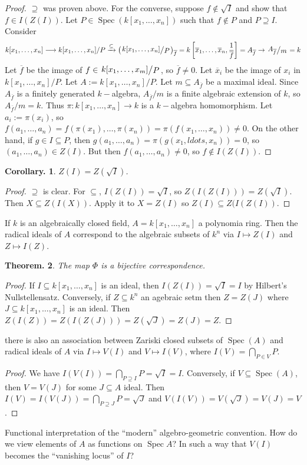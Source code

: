 \documentclass[11pt, a4paper]{memoir}
\newcommand{\lto}[0]{\ensuremath{\longrightarrow}}
\newcommand{\fto}[1]{\ensuremath{\xrightarrow{\scriptstyle{#1}}}}
\theoremstyle{change}
\newtheorem{theorem}{Theorem.}[section]
\newtheorem{corollary}[theorem]{Corollary.}
\theoremstyle{plain}
\theoremstyle{nonumberplain}
\newtheorem{proof}{Proof}
\DeclareMathOperator{\Spec}{Spec}
\newcommand{\quot}[2]{\mathchoice{\left.\raisebox{0.12em}{$#1$}\middle/\raisebox{-0.12em}{$#2$}\right.}
                                 {\left.\raisebox{0.06em}{$#1$}\middle/\raisebox{-0.06em}{$#2$}\right.}
                                 {\left.\raisebox{0.02em}{$#1$}\middle/\raisebox{-0.02em}{$#2$}\right.}
                                 {\left.\raisebox{0em}{$#1$}\middle/\raisebox{0em}{$#2$}\right.}}
\numberwithin{equation}{section}
\begin{document}
\begin{proof}
    $\supseteq$ was proven above.
    For the converse, suppose $f\notin\sqrt{I}$ and show that $f\in I(Z(I))$.
    Let $P\in\Spec(k[x_1,\ldots,x_n])$ such that $f\notin P$ and $P\supseteq I$.
    Consider
    \begin{equation*}
        k[x_1,\ldots,x_n]\lto k[x_1,\ldots,x_n]/P\fto{\subseteq}\left(\quot{k[x_1,\ldots,x_n]}{P}\right)_{\overline{f}}=k\left[\overline{x}_1,\ldots,\overline{x}_n,\frac{1}{\overline{f}}\right]=A_{\overline{f}}\to \quot{A_{\overline{f}}}{m}=k
    \end{equation*}
    Let $\overline{f}$ be the image of $f\in\quot{k[x_1,\ldots,x_m]}{P}$, so $\overline{f}\neq 0$.
    Let $\overline{x}_i$ be the image of $x_i$ in $k[x_1,\ldots,x_n]/P$.
    Let $A:= k[x_1,\ldots,x_n]/P$.
    Let $m\subseteq A_{\overline{f}}$ be a maximal ideal.
    Since $A_{\overline{f}}$ is a finitely generated $k-$algebra, $A_{\overline{f}}/m$ is a finite algebraic extension of $k$, so $A_{\overline{f}}/m=k$.
    Thus $\pi:k[x_1,\ldots,x_n]\to k$ is a $k-$algebra homomorphism.
    Let $a_i:=\pi(x_i)$, so $f(a_1,\ldots,a_n)=f(\pi(x_1),\ldots,\pi(x_n))=\pi(f(x_1,\ldots,x_n))\neq 0$.
    On the other hand, if $g\in I\subseteq P$, then $g(a_1,\ldots,a_n)=\pi(g(x_1,ldots,x_n))=0$, so $(a_1,\ldots,a_n)\in Z(I)$.
    But then $f(a_1,\ldots,a_n)\neq 0$, so $f\notin I(Z(I))$.
\end{proof}
\begin{corollary}
    $Z(I)=Z(\sqrt{I})$.
\end{corollary}
\begin{proof}
    $\supseteq$ is clear.
    For $\subseteq$, $I(Z(I))=\sqrt{I}$, so $Z(I(Z(I)))=Z(\sqrt{I})$.
    Then $X\subseteq Z(I(X))$.
    Apply it to $X=Z(I)$ so $Z(I)\subseteq Z(I(Z(I))$.
\end{proof}
If $k$ is an algebraically closed field, $A=k[x_1,\ldots,x_n]$ a polynomia ring.
Then the radical ideals of $A$ correspond to the algebraic subsets of $k^n$ via $I\mapsto Z(I)$ and $Z\mapsto I(Z)$.
\begin{theorem}
    The map $\Phi$ is a bijective correspondence.
\end{theorem}
\begin{proof}
    If $I\subseteq k[x_1,\ldots,x_n]$ is an ideal, then $I(Z(I))=\sqrt{I}=I$ by Hilbert's Nullstellensatz.
    Conversely, if $Z\subseteq k^n$ an agebraic setm then $Z=Z(J)$ where $J\subseteq k[x_1,\ldots,x_n]$ is an ideal.
    Then $Z(I(Z))=Z(I(Z(J)))=Z(\sqrt{J})=Z(J)=Z$.
\end{proof}
there is also an association between Zariski closed subsets of $\Spec(A)$ and radical ideals of $A$ via $I\mapsto V(I)$ and $V\mapsto I(V)$, where $I(V)=\bigcap_{P\in V}P$.
\begin{proof}
    We have $I(V(I))=\bigcap_{P\supseteq I}P=\sqrt{I}=I$.
    Conversely, if $V\subseteq\Spec(A)$, then $V=V(J)$ for some $J\subseteq A$ ideal.
    Then $I(V)=I(V(J))=\bigcap_{P\supseteq J}P=\sqrt{J}$ and $V(I(V))=V(\sqrt{J})=V(J)=V$.
\end{proof}
Functional interpretation of the ``modern'' algebro-geometric convention.
How do we view elements of $A$ as functions on $\Spec A$?
In such a way that $V(I)$ becomes the ``vanishing locus'' of $I$?
\end{document}

